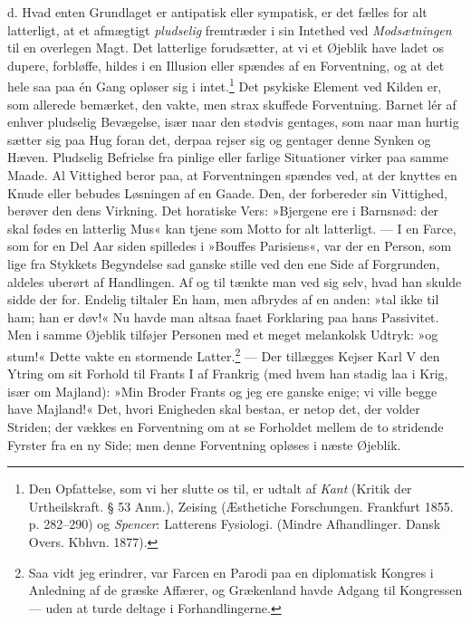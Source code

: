 \documentclass[12pt,a4paper,openany]{book}
\newcommand{\opage}[1]{\marginnote{\footnotesize\textit{[#1]}}}
\begin{document}
d. Hvad enten Grundlaget er antipatisk eller sympatisk, er det fælles
for alt latterligt, at et afmægtigt \emph{pludselig} fremtræder i sin
Intethed ved \emph{Modsætningen} til en overlegen Magt. Det latterlige
forudsætter, at vi et Øjeblik have ladet os dupere, forbløffe, hildes i
en Illusion eller spændes af en Forventning, og at det hele saa paa én
Gang opløser sig i intet.\footnote[2]{Den Opfattelse, som vi her slutte
os til, er udtalt af \emph{Kant} (Kritik der Urtheilskraft. § 53 Anm.),
Zeising (Æsthetiche Forschungen. Frankfurt 1855. p. 282--290) og
\emph{Spencer}: Latterens Fysiologi. (Mindre Afhandlinger. Dansk Overs.
Kbhvn. 1877).} Det psykiske Element ved Kilden er, som allerede
bemærket, den vakte, men strax skuffede Forventning. Barnet lér af
enhver pludselig Bevægelse, især naar den stødvis gentages, som naar man
hurtig sætter sig paa Hug foran det, derpaa rejser sig og gentager denne
Synken og Hæven. Pludselig Befrielse fra pinlige eller farlige
Situationer virker paa samme Maade. Al Vittighed beror paa, at
Forventningen spændes ved, at der knyttes en Knude eller bebudes
Løsningen af en Gaade. Den, der forbereder sin Vittighed, berøver den
dens Virkning. Det horatiske Vers: »Bjergene ere i Barnsnød: der skal
fødes en latterlig Mus« kan tjene som Motto for alt latterligt. --- I en
Farce, som for en Del Aar siden spilledes i »Bouffes Parisiens«, var der
en Person, som lige
\opage{350}fra Stykkets Begyndelse sad ganske stille ved den ene Side af
Forgrunden, aldeles uberørt af Handlingen. Af og til tænkte man ved sig
selv, hvad han skulde sidde der for. Endelig tiltaler En ham, men
afbrydes af en anden: »tal ikke til ham; han er døv!« Nu havde man
altsaa faaet Forklaring paa hans Passivitet. Men i samme Øjeblik
tilføjer Personen med et meget melankolsk Udtryk: »og stum!« Dette vakte
en stormende Latter.\footnote[1]{Saa vidt jeg erindrer, var Farcen en
Parodi paa en diplomatisk Kongres i Anledning af de græske Affærer, og
Grækenland havde Adgang til Kongressen --- uden at turde deltage i
Forhandlingerne.} --- Der tillægges Kejser Karl V den Ytring om sit
Forhold til Frants I af Frankrig (med hvem han stadig laa i Krig, især
om Majland): »Min Broder Frants og jeg ere ganske enige; vi ville begge
have Majland!« Det, hvori Enigheden skal bestaa, er netop det, der
volder Striden; der vækkes en Forventning om at se Forholdet mellem de
to stridende Fyrster fra en ny Side; men denne Forventning opløses i
næste Øjeblik.
\end{document}
